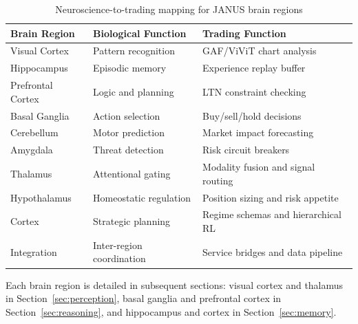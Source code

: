 \documentclass[12pt, a4paper]{article}
\begin{document}
\begin{table}[htbp]
	\centering
	\caption{Neuroscience-to-trading mapping for JANUS brain regions}
	\label{tab:brain_mapping}
	\begin{tabularx}{\textwidth}{|l|L|L|}
		\hline
		\textbf{Brain Region} & \textbf{Biological Function}                          & \textbf{Trading Function}                                        \\
		\hline
		Visual Cortex         & Pattern recognition                                   & GAF/ViViT chart analysis \citep{wang2015imaging, arnab2021vivit} \\
		\hline
		Hippocampus           & Episodic memory \citep{buzsaki2015hippocampal}        & Experience replay buffer \citep{schaul2015prioritized}           \\
		\hline
		Prefrontal Cortex     & Logic and planning \citep{frank2006working}           & LTN constraint checking \citep{badreddine2022logic}              \\
		\hline
		Basal Ganglia         & Action selection \citep{collins2014opponent}          & Buy/sell/hold decisions                                          \\
		\hline
		Cerebellum            & Motor prediction \citep{wolpert1998cerebellum}        & Market impact forecasting \citep{almgren2001optimal}             \\
		\hline
		Amygdala              & Threat detection \citep{ledoux2000emotion}            & Risk circuit breakers                                            \\
		\hline
		Thalamus              & Attentional gating \citep{halassa2017thalamic}        & Modality fusion and signal routing                               \\
		\hline
		Hypothalamus          & Homeostatic regulation \citep{sterling2012allostasis} & Position sizing and risk appetite                                \\
		\hline
		Cortex                & Strategic planning                                    & Regime schemas and hierarchical RL                               \\
		\hline
		Integration           & Inter-region coordination                             & Service bridges and data pipeline                                \\
		\hline
	\end{tabularx}
\end{table}

Each brain region is detailed in subsequent sections: visual cortex and thalamus in Section~\ref{sec:perception}, basal ganglia and prefrontal cortex in Section~\ref{sec:reasoning}, and hippocampus and cortex in Section~\ref{sec:memory}.
\end{document}

